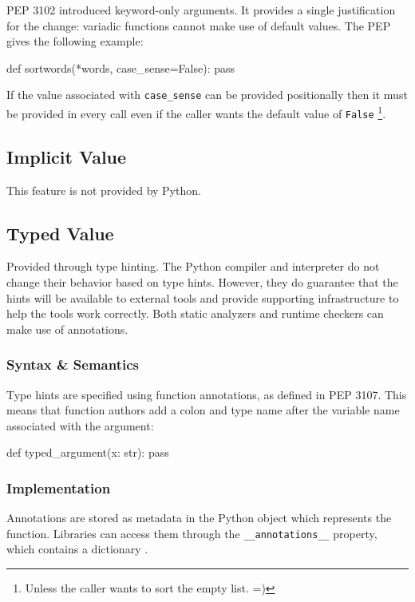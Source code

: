 PEP 3102 introduced keyword-only arguments.
It provides a single justification for the change: variadic functions cannot make use of
default values.
The PEP gives the following example:

\begin{pygmented}[lang=python]
def sortwords(*words, case_sense=False):
    pass
\end{pygmented}

If the value associated with \texttt{case\_sense} can be provided positionally then it
must be provided in every call even if the caller wants the default value of
\texttt{False}
\footnote{
	Unless the caller wants to sort the empty list. =)
}.

\subsection{Implicit Value}

This feature is not provided by Python.

\subsection{Typed Value}
Provided through type hinting.
The Python compiler and interpreter do not change their behavior based on type hints.
However, they do guarantee that the hints will be available to external tools and provide
supporting infrastructure to help the tools work correctly.
Both static analyzers and runtime checkers can make use of annotations.

\subsubsection{Syntax \& Semantics}

Type hints are specified using function annotations, as defined in PEP 3107.
This means that function authors add a colon and type name after the variable name
associated with the argument:

\begin{pygmented}[lang=python]
def typed_argument(x: str):
  pass
\end{pygmented}

\subsubsection{Implementation}

Annotations are stored as metadata in the Python object which represents the function.
Libraries can access them through the \texttt{\_\_annotations\_\_} property, which
contains a dictionary
\parencite[][peps/pep-3107.rst, "Accessing Function Annotations"]{python-peps}.

